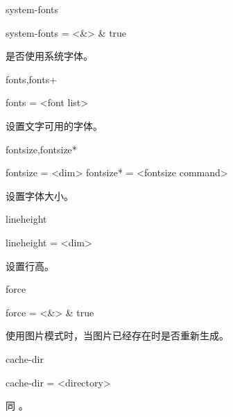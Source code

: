 \documentclass[class=article,openany]{cusdoc}
\begin{document}
\begin{keyval}[path=layout]{system-fonts}
  \begin{syntax}
    system-fonts = <&\TTF> & true
  \end{syntax}
是否使用系统字体。
\end{keyval}

\begin{keyval}[path=layout]{fonts,fonts+}
  \begin{syntax}
    fonts = <{font list}>
  \end{syntax}
设置文字可用的字体。
\end{keyval}

\begin{keyval}[path=layout]{fontsize,fontsize*}
  \begin{syntax}
    fontsize  = <{dim}>
    fontsize* = <{fontsize command}>
  \end{syntax}
设置字体大小。
\end{keyval}

\begin{keyval}[path=layout]{lineheight}
  \begin{syntax}
    lineheight = <{dim}>
  \end{syntax}
设置行高。
\end{keyval}

\begin{keyval}[path=layout]{force}
  \begin{syntax}
    force = <&\TTF> & true
  \end{syntax}
使用图片模式时，当图片已经存在时是否重新生成。
\end{keyval}

\begin{keyval}[path=layout]{cache-dir}
  \begin{syntax}
    cache-dir = <{directory}>
  \end{syntax}
同 。
\end{keyval}

\printindex[docchange]
\printindex[docusage]
\end{document}
